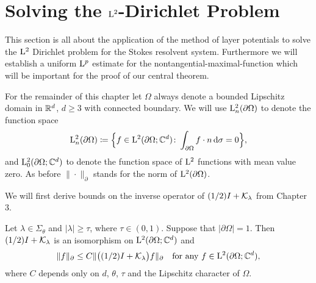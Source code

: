 \chapter{Solving the $\mathrm{L}^2$-Dirichlet Problem}

This section is all about the application of the method of layer potentials to solve the $\mathrm{L}^2$ Dirichlet problem for the Stokes resolvent system.
Furthermore we will establish a uniform $\mathrm{L}^p$ estimate for the nontangential-maximal-function which will be important for the proof of our central theorem.

For the remainder of this chapter let $\Omega$ always denote a bounded Lipschitz domain in $\mathbb{R}^d$, $d \geq 3$ with connected boundary.
We will use $\mathrm{L}^2_n(\partial\Omega)$ to denote the function space
\begin{align*}
  \mathrm{L}^2_n(\partial\Omega) \coloneqq \Big\{ f \in \mathrm{L}^2(\partial\Omega; \mathbb{C}^d) \colon \int_{\partial\Omega} f \cdot n \, {\operatorname{d}\!{\sigma}} = 0 \Big\},
\end{align*}
and $\mathrm{L}_0^2(\partial\Omega; \mathbb{C}^d)$  to denote the function space of $\mathrm{L}^2$ functions with mean value zero.
As before $\| \cdot \|_\partial$ stands for the norm of $\mathrm{L}^2(\partial\Omega)$.

We will first derive bounds on the inverse operator of $(1/2) I + \mathcal{K}_\lambda$ from Chapter 3.

\begin{lem}
  Let $\lambda \in \Sigma_\theta$ and $|\lambda| \geq \tau$, where $\tau \in (0,1)$.
  Suppose that $|\partial\Omega| = 1$.
  Then $(1/2)I + \mathcal{K}_\lambda$ is an isomorphism on $\mathrm{L}^2(\partial\Omega; \mathbb{C}^d)$ and
  \begin{align}
    \label{eq:inverseEstimate}
    \| f\|_\partial \leq C \|\big( (1/2) I + \mathcal{K}_\lambda \big) f \|_\partial \quad\text{for any } f \in \mathrm{L}^2(\partial\Omega; \mathbb{C}^d),
  \end{align}
  where $C$ depends only on $d$, $\theta$, $\tau$ and the Lipschitz character of $\Omega$.
\end{lem}

